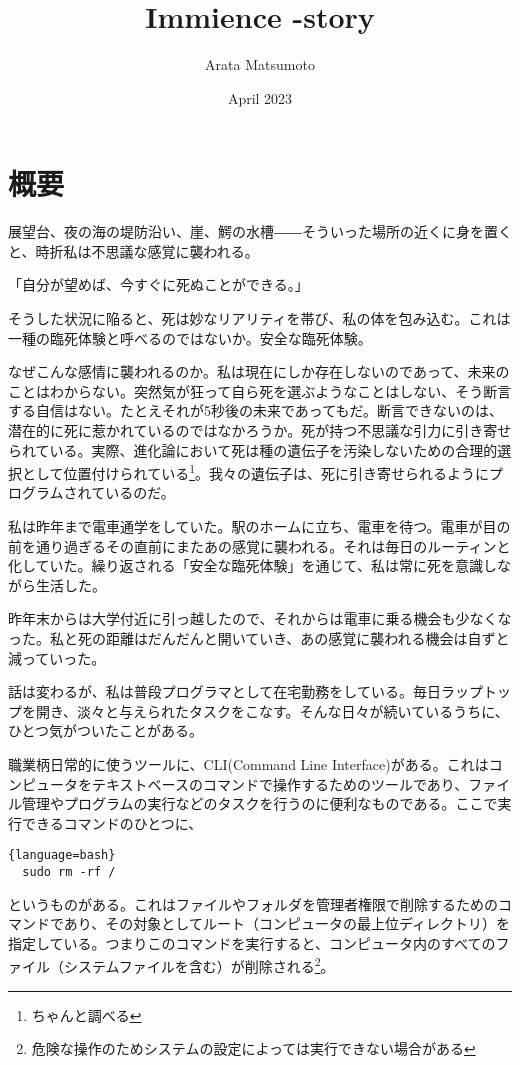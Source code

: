 \documentclass[a4paper]{article}
\title{Immience -story}
\author{Arata Matsumoto}
\date{April 2023}
\begin{document}
\maketitle
\section{概要}
展望台、夜の海の堤防沿い、崖、鰐の水槽――そういった場所の近くに身を置くと、時折私は不思議な感覚に襲われる。

「自分が望めば、今すぐに死ぬことができる。」

そうした状況に陥ると、死は妙なリアリティを帯び、私の体を包み込む。これは一種の臨死体験と呼べるのではないか。安全な臨死体験。

なぜこんな感情に襲われるのか。私は現在にしか存在しないのであって、未来のことはわからない。突然気が狂って自ら死を選ぶようなことはしない、そう断言する自信はない。たとえそれが5秒後の未来であってもだ。断言できないのは、潜在的に死に惹かれているのではなかろうか。死が持つ不思議な引力に引き寄せられている。実際、進化論において死は種の遺伝子を汚染しないための合理的選択として位置付けられている\footnote{ちゃんと調べる}。我々の遺伝子は、死に引き寄せられるようにプログラムされているのだ。

私は昨年まで電車通学をしていた。駅のホームに立ち、電車を待つ。電車が目の前を通り過ぎるその直前にまたあの感覚に襲われる。それは毎日のルーティンと化していた。繰り返される「安全な臨死体験」を通じて、私は常に死を意識しながら生活した。

昨年末からは大学付近に引っ越したので、それからは電車に乗る機会も少なくなった。私と死の距離はだんだんと開いていき、あの感覚に襲われる機会は自ずと減っていった。

話は変わるが、私は普段プログラマとして在宅勤務をしている。毎日ラップトップを開き、淡々と与えられたタスクをこなす。そんな日々が続いているうちに、ひとつ気がついたことがある。

職業柄日常的に使うツールに、CLI(Command Line Interface)がある。これはコンピュータをテキストベースのコマンドで操作するためのツールであり、ファイル管理やプログラムの実行などのタスクを行うのに便利なものである。ここで実行できるコマンドのひとつに、

\begin{lstlisting}{language=bash}
  sudo rm -rf /
\end{lstlisting}

というものがある。これはファイルやフォルダを管理者権限で削除するためのコマンドであり、その対象としてルート（コンピュータの最上位ディレクトリ）を指定している。つまりこのコマンドを実行すると、コンピュータ内のすべてのファイル（システムファイルを含む）が削除される\footnote{危険な操作のためシステムの設定によっては実行できない場合がある}。
\end{document}
